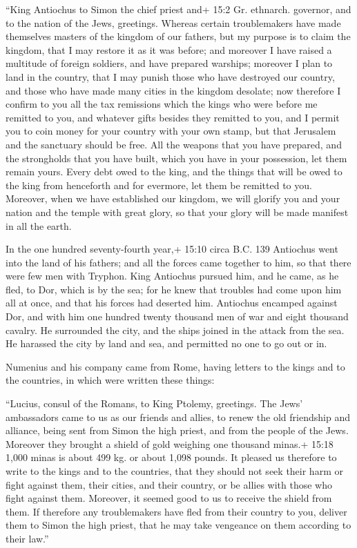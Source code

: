 ``King Antiochus to Simon the chief priest and+ 15:2 Gr. ethnarch.
governor, and to the nation of the Jews, greetings.  Whereas
certain troublemakers have made themselves masters of the kingdom of our
fathers, but my purpose is to claim the kingdom, that I may restore it
as it was before; and moreover I have raised a multitude of foreign
soldiers, and have prepared warships;  moreover I plan to
land in the country, that I may punish those who have destroyed our
country, and those who have made many cities in the kingdom desolate;
 now therefore I confirm to you all the tax remissions which
the kings who were before me remitted to you, and whatever gifts besides
they remitted to you,  and I permit you to coin money for
your country with your own stamp,  but that Jerusalem and
the sanctuary should be free. All the weapons that you have prepared,
and the strongholds that you have built, which you have in your
possession, let them remain yours.  Every debt owed to the
king, and the things that will be owed to the king from henceforth and
for evermore, let them be remitted to you.  Moreover, when
we have established our kingdom, we will glorify you and your nation and
the temple with great glory, so that your glory will be made manifest in
all the earth.

 In the one hundred seventy-fourth year,+ 15:10 circa B.C.
139 Antiochus went into the land of his fathers; and all the forces came
together to him, so that there were few men with Tryphon. 
King Antiochus pursued him, and he came, as he fled, to Dor, which is by
the sea;  for he knew that troubles had come upon him all
at once, and that his forces had deserted him.  Antiochus
encamped against Dor, and with him one hundred twenty thousand men of
war and eight thousand cavalry.  He surrounded the city,
and the ships joined in the attack from the sea. He harassed the city by
land and sea, and permitted no one to go out or in.

 Numenius and his company came from Rome, having letters to
the kings and to the countries, in which were written these things:

 ``Lucius, consul of the Romans, to King Ptolemy,
greetings.  The Jews' ambassadors came to us as our friends
and allies, to renew the old friendship and alliance, being sent from
Simon the high priest, and from the people of the Jews. 
Moreover they brought a shield of gold weighing one thousand minas.+
15:18 1,000 minas is about 499 kg. or about 1,098 pounds. 
It pleased us therefore to write to the kings and to the countries, that
they should not seek their harm or fight against them, their cities, and
their country, or be allies with those who fight against them.
 Moreover, it seemed good to us to receive the shield from
them.  If therefore any troublemakers have fled from their
country to you, deliver them to Simon the high priest, that he may take
vengeance on them according to their law.''

